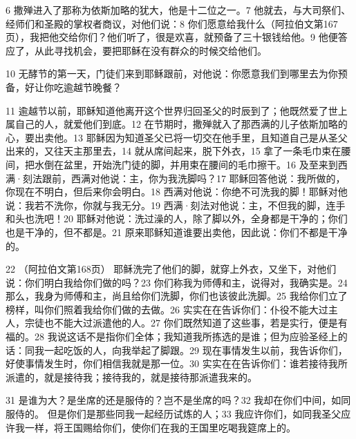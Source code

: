 6  撒殚进入了那称为依斯加略的犹大，他是十二位之一。7 他就去，与大司祭们、经师们和圣殿的掌权者商议，对他们说：8 你们愿意给我什么（阿拉伯文第167页），我把他交给你们？他们听了，很是欢喜，就预备了三十银钱给他。9  他便答应了，从此寻找机会，要把耶稣在没有群众的时候交给他们。\par

10  无酵节的第一天，门徒们来到耶稣跟前，对他说：你愿意我们到哪里去为你预备，好让你吃逾越节晚餐？\par

11  逾越节以前，耶稣知道他离开这个世界归回圣父的时辰到了；他既然爱了世上属自己的人，就爱他们到底。12  在节期时，撒殚就入了那西满的儿子依斯加略的心，要出卖他。13  耶稣因为知道圣父已将一切交在他手里，且知道自己是从圣父出来的，又往天主那里去，14  就从席间起来，脱下外衣，15  拿了一条毛巾束在腰间，把水倒在盆里，开始洗门徒的脚，并用束在腰间的毛巾擦干。16  及至来到西满·刻法跟前，西满对他说：主，你为我洗脚吗？17  耶稣回答他说：我所做的，你现在不明白，但后来你会明白。18  西满对他说：你绝不可洗我的脚！耶稣对他说：我若不洗你，你就与我无分。19  西满·刻法对他说：主，不但我的脚，连手和头也洗吧！20  耶稣对他说：洗过澡的人，除了脚以外，全身都是干净的；你们也是干净的，但不都是。21  原来耶稣知道谁要出卖他，因此说：你们不都是干净的。\par

22 （阿拉伯文第168页） 耶稣洗完了他们的脚，就穿上外衣，又坐下，对他们说：你们明白我给你们做的吗？23  你们称我为师傅和主，说得对，我确实是。24  那么，我身为师傅和主，尚且给你们洗脚，你们也该彼此洗脚。25  我给你们立了榜样，叫你们照着我给你们做的去做。26  实实在在告诉你们：仆役不能大过主人，宗徒也不能大过派遣他的人。27  你们既然知道了这些事，若是实行，便是有福的。28  我说这话不是指你们全体；我知道我所拣选的是谁；但为应验圣经上的话：同我一起吃饭的人，向我举起了脚跟。29  现在事情发生以前，我告诉你们，好使事情发生时，你们相信我就是那一位。30  实实在在告诉你们：谁若接待我所派遣的，就是接待我；接待我的，就是接待那派遣我来的。\par

31  是谁为大？是坐席的还是服侍的？岂不是坐席的吗？32  我却在你们中间，如同服侍的。 但是你们是那些同我一起经历试炼的人；33  我应许你们，如同我圣父应许我一样，将王国赐给你们，使你们在我的王国里吃喝我筵席上的。\par

